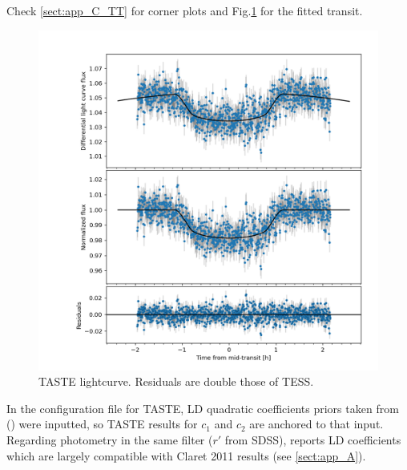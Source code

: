 \documentclass{aa}
\begin{document}
Check  \ref{sect:app_C_TT} for corner plots and Fig.\ref{fig: lc2} for the fitted transit.
\begin{figure}[H]
    \centering
    \includegraphics[scale=0.25, angle=0]{pictures/lctaste.png}
    \caption{TASTE lightcurve. Residuals are double those of TESS.}
   \label{fig: lc2}
\end{figure}
 In the configuration file for TASTE, LD quadratic coefficients priors taken from (\cite{claret2011}) were inputted, so TASTE results for $c_1$ and $c_2$ are anchored to that input. Regarding photometry in the same filter ($r'$ from SDSS), \cite{Addison} reports LD coefficients which are largely compatible with Claret 2011 results (see \ref{sect:app_A}).
 
\end{document}
